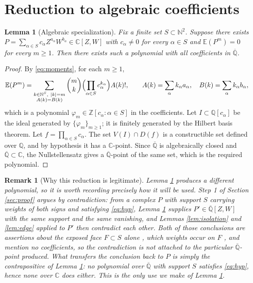 \documentclass[10pt,a4paper]{amsart}
\newtheorem{lemma}[theorem]{Lemma}
\newtheorem{remark}[theorem]{Remark}
\numberwithin{equation}{section}
\newcommand{\C}{\mathbb{C}}
\newcommand{\Q}{\mathbb{Q}}
\newcommand{\Z}{\mathbb{Z}}
\newcommand{\N}{\mathbb{N}}
\newcommand{\E}{\mathbb{E}}
\newcommand{\Qbar}{\overline{\Q}}
\begin{document}
\section{Reduction to algebraic coefficients}\label{sec:spec}

\begin{lemma}[Algebraic specialization]\label{lem:spec}
Fix a finite set $S\subset\N^2$. Suppose there exists
$P=\sum_{\alpha\in S}c_\alpha Z^{a_\alpha}W^{b_\alpha}\in\C[Z,W]$ with
$c_\alpha\ne0$ for every $\alpha\in S$ and $\E(P^m)=0$ for every $m\ge1$. Then
there exists such a polynomial with all coefficients in $\Qbar$.
\end{lemma}

\begin{proof}
By \eqref{eq:moments}, for each $m\ge1$,
\begin{equation}\label{eq:momentexp}
  \E(P^m)=\sum_{\substack{k\in\N^{S},\ |k|=m\\ A(k)=B(k)}}
  \binom{m}{k}\Bigl(\prod_{\alpha\in S}c_\alpha^{k_\alpha}\Bigr)A(k)!,
  \qquad
  A(k)=\sum_\alpha k_\alpha a_\alpha,\quad B(k)=\sum_\alpha k_\alpha b_\alpha,
\end{equation}
which is a polynomial $\varphi_m\in\Z[c_\alpha:\alpha\in S]$ in the
coefficients. Let $I\subset\Q[c_\alpha]$ be the ideal generated by
$\{\varphi_m\}_{m\ge1}$; it is finitely generated by the Hilbert basis theorem.
Let $f=\prod_{\alpha\in S}c_\alpha$. The set
$V(I)\cap D(f)$ is a constructible set defined over $\Q$, and by hypothesis it
has a $\C$-point. Since $\Qbar$ is algebraically closed and
$\Qbar\subset\C$, the Nullstellensatz gives a $\Qbar$-point of the same set,
which is the required polynomial.
\end{proof}

\begin{remark}[Why this reduction is legitimate]\label{rem:supportonly}
Lemma \ref{lem:spec} produces a \emph{different} polynomial, so it is worth
recording precisely how it will be used. Step 1 of Section \ref{sec:proof}
argues by contradiction: from a complex $P$ with support $S$ carrying weights of
both signs and satisfying \eqref{eq:hyp}, Lemma \ref{lem:spec} supplies
$P'\in\Qbar[Z,W]$ with the same support and the same vanishing, and Lemmas
\ref{lem:isolation} and \ref{lem:edge} applied to $P'$ then contradict each
other. Both of those conclusions are assertions about the exposed face
$F\subset S$ alone ,  which weights occur on $F$ ,  and mention no
coefficients, so the contradiction is not attached to the particular
$\Qbar$-point produced. What transfers the conclusion back to $P$ is simply the
contrapositive of Lemma \ref{lem:spec}: no polynomial over $\Qbar$ with support
$S$ satisfies \eqref{eq:hyp}, hence none over $\C$ does either. This is the only
use we make of Lemma \ref{lem:spec}.
\end{remark}
\end{document}
